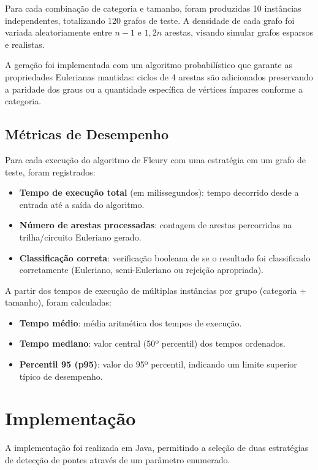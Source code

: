 \documentclass{sbc2023}%
\begin{document}
Para cada combinação de categoria e tamanho, foram produzidas 10 instâncias independentes, totalizando 120 grafos de teste. A densidade de cada grafo foi variada aleatoriamente entre $n-1$ e $1,2n$ arestas, visando simular grafos esparsos e realistas.

A geração foi implementada com um algoritmo probabilístico que garante as propriedades Eulerianas mantidas: ciclos de 4 arestas são adicionados preservando a paridade dos graus ou a quantidade específica de vértices ímpares conforme a categoria.

\subsection{Métricas de Desempenho}

Para cada execução do algoritmo de Fleury com uma estratégia em um grafo de teste, foram registrados:

\begin{itemize}
    \item \textbf{Tempo de execução total} (em milissegundos): tempo decorrido desde a entrada até a saída do algoritmo.
    \item \textbf{Número de arestas processadas}: contagem de arestas percorridas na trilha/circuito Euleriano gerado.
    \item \textbf{Classificação correta}: verificação booleana de se o resultado foi classificado corretamente (Euleriano, semi-Euleriano ou rejeição apropriada).
\end{itemize}

A partir dos tempos de execução de múltiplas instâncias por grupo (categoria + tamanho), foram calculadas:
\begin{itemize}
    \item \textbf{Tempo médio}: média aritmética dos tempos de execução.
    \item \textbf{Tempo mediano}: valor central (50º percentil) dos tempos ordenados.
    \item \textbf{Percentil 95 (p95)}: valor do 95º percentil, indicando um limite superior típico de desempenho.
\end{itemize}

\section{Implementação}

A implementação foi realizada em Java, permitindo a seleção de duas estratégias de detecção de pontes através de um parâmetro enumerado.
\end{document}
